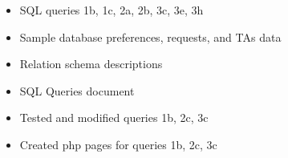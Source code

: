 \begin{itemize}
	\item SQL queries 1b, 1c, 2a, 2b, 3c, 3e, 3h
	\item Sample database preferences, requests, and TAs data
	\item Relation schema descriptions
	\item SQL Queries document
	\item Tested and modified queries 1b, 2c, 3c
	\item Created php pages for queries 1b, 2c, 3c

\end{itemize}